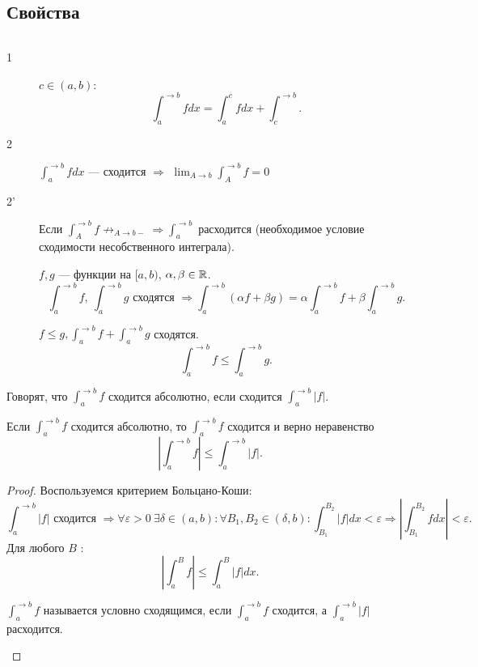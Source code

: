 % 
% 

\subsection{Свойства}
\begin{prop}
    $ $
    \begin{description}
	\item[1] $ c \in  (a, b)$:
	    \[
		\int_{a }^{ \to b}  f dx = \int_{ a }^{c} f dx + \int_{ c}^{ \to b}
	    .\]
	\item [2]$ \int_{a}^{ \to  b} f dx $ --- сходится $ \Longrightarrow $ $ \lim_{A \to  b} \int_{A}^{ \to b} f = 0 $
\item[2'] Если $ \int_{A}^{ \to b} f \not\to_{A \to b-} \Longrightarrow  \int_{a}^{ \to b}  $ расходится (необходимое условие сходимости несобственного интеграла).
\item [] $ f, g$ --- функции на $ [a, b)$,  $ \alpha , \beta  \in \mathbb{R}$.
    \[
	\int_{a}^{  \to b} f, ~ \int_{a}^{ \to  b}  g  \text{ сходятся } \Longrightarrow \int_{a}^{\to b} ( \alpha  f + \beta  g)  = \alpha \int_{ a}^{ \to b}  f    + \beta  \int_{a}^{ \to  b}  g
    .\]
\item  []
    $ f \le  g,  \int_{ a}^{ \to b} f + \int_{a}^{ \to b} g   $ сходятся. \[
	\int_{ a}^{ \to  b} f \le  \int_{ a}^{ \to b}  g
    .\]
    \end{description}
    \begin{defn}
	Говорят, что $ \int_{a}^{\to b} f  $ {\sf   сходится абсолютно}, если сходится $ \int_{a}^{ \to b} |f|  $.
    \end{defn}
    Если $ \int_{a}^{ \to  b} f $ сходится абсолютно, то $ \int_{a}^{ \to  b} f $ сходится и верно неравенство
    \[
	\left| \int_{a}^{ \to b}  f  \right| \le  \int_a ^{ \to b}\left| f  \right|
    .\]
    \begin{proof}
	Воспользуемся критерием Больцано-Коши:
	\[
	    \int_{ a}^{ \to  b} |f| \text{  сходится } \Longrightarrow  \forall  \varepsilon  >0 ~ \exists \delta \in  (a, b): \forall B_1, B_2 \in (\delta,  b): \int_{B_1}^{B_2}  |f| dx < \varepsilon  \Longrightarrow \left| \int_{B_1}^{B_2} f dx  \right| < \varepsilon
	.\]
	Для любого $ B$ :
	\[
	    \left|  \int_{ a}^{B} f   \right| \le  \int_{a}^{ B} |f|dx
	.\]
	\begin{defn}
	    $ \int_{a}^{ \to  b} f  $ называется {\sf   условно сходящимся}, если $ \int_{a}^{ \to b} f $ сходится, а $ \int_{a}^{ \to b} |f| $ расходится.
	\end{defn}


\end{proof}
\end{prop}
